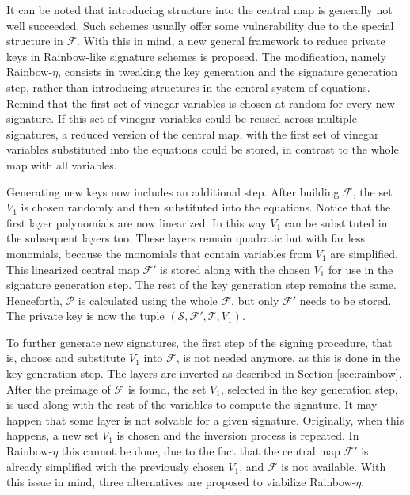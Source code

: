 \documentclass{ufsctex/ufsctex}
\begin{document}
It can be noted that introducing structure into the central map is generally
not well succeeded. Such schemes usually offer some vulnerability due to the
special structure in $\mathcal{F}$. With this in mind, a new general framework
to reduce private keys in Rainbow-like signature schemes is proposed. The
modification, namely Rainbow-$\eta$, consists in tweaking the key generation
and the signature generation step, rather than introducing structures in the
central system of equations. Remind that the first set of vinegar variables is
chosen at random for every new signature. If this set of vinegar variables
could be reused across multiple signatures, a reduced version of the central
map, with the first set of vinegar variables substituted into the equations
could be stored, in contrast to the whole map with all variables.

Generating new keys now includes an additional step. After building
$\mathcal{F}$, the set $V_1$ is chosen randomly and then substituted into the
equations. Notice that the first layer polynomials are now linearized. In this
way $V_1$ can be substituted in the subsequent layers too. These layers remain
quadratic but with far less monomials, because the monomials that contain
variables from $V_1$ are simplified. This linearized central map $\mathcal{F'}$
is stored along with the chosen $V_1$ for use in the signature generation step.
The rest of the key generation step remains the same. Henceforth, $\mathcal{P}$
is calculated using the whole $\mathcal{F}$, but only $\mathcal{F'}$ needs to
be stored. The private key is now the tuple $(\mathcal{S}, \mathcal{F'},
\mathcal{T}, V_1)$.

To further generate new signatures, the first step of the signing procedure,
that is, choose and substitute $V_1$ into $\mathcal{F}$, is not needed anymore,
as this is done in the key generation step. The layers are inverted as
described in Section \ref{sec:rainbow}. After the preimage of $\mathcal{F}$ is
found, the set $V_1$, selected in the key generation step, is used along with
the rest of the variables to compute the signature. It may happen that some
layer is not solvable for a given signature. Originally, when this happens, a
new set $V_1$ is chosen and the inversion process is repeated. In
Rainbow-$\eta$ this cannot be done, due to the fact that the central map
$\mathcal{F'}$ is already simplified with the previously chosen $V_1$, and
$\mathcal{F}$ is not available. With this issue in mind, three alternatives are
proposed to viabilize Rainbow-$\eta$.
\end{document}
